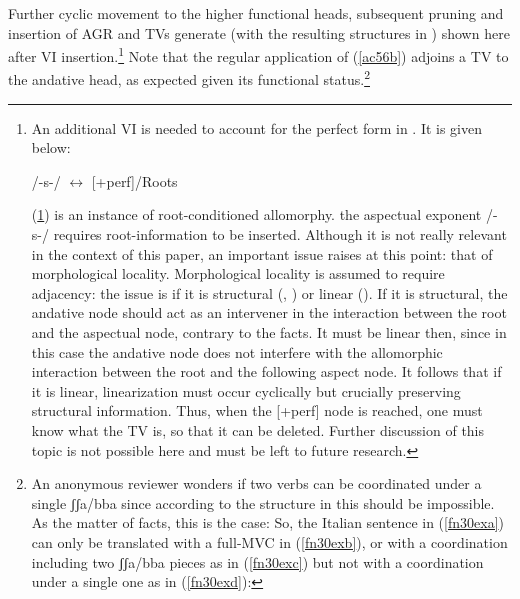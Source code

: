 \documentclass[output=paper]{langscibook}
\begin{document}
Further cyclic movement to the higher functional heads, subsequent pruning and insertion of AGR and TVs generate  (with the resulting structures in ) shown here after VI insertion.\footnote{An additional VI is needed to account for the perfect form in .  It is given below:

\ea \label{fn29ex} /-s-/ $\longleftrightarrow$ [+perf]/Roots \underline{\hspace{2em}}
\z

(\ref{fn29ex}) is an instance of root-conditioned allomorphy. the aspectual exponent /-s-/ requires root-information to be inserted. Although it is not really relevant in the context of this paper, an important issue raises at this point: that of morphological locality.  Morphological locality is assumed to require adjacency: the issue is if it is structural (\cite{bobaljik2012a}, \cite{calabrese2019a}) or linear (\cite{embick2010a}).  If it is structural, the andative node should act as an intervener in the interaction between the root and the aspectual node, contrary to the facts. It must be linear then, since in this case the andative node does not interfere with the allomorphic interaction between the root and the following aspect node. It follows that if it is linear, linearization must occur cyclically but crucially preserving structural information. Thus, when the [+perf] node is reached, one must know what the TV is, so that it can be deleted. Further discussion of this topic is not possible here and must be left to future research.} Note that the regular application of (\ref{ac56b}) adjoins a TV to the andative head, as expected given its functional status.\footnote{An anonymous reviewer wonders if two verbs can be coordinated under a single ʃʃa/bba since according to the structure in  this should be impossible. As the matter of facts, this is the case: So, the Italian sentence in (\ref{fn30exa}) can only be translated with a full-MVC in (\ref{fn30exb}), or with a coordination including two ʃʃa/bba pieces as in (\ref{fn30exc}) but not with a coordination under a single one as in (\ref{fn30exd}):

}
\end{document}
